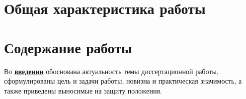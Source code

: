 \section*{Общая характеристика работы}

\newcommand{\actuality}{\pdfbookmark[1]{Актуальность}{actuality}\underline{\textbf{\actualityTXT}}}
\newcommand{\progress}{\pdfbookmark[1]{Разработанность темы}{progress}\underline{\textbf{\progressTXT}}}
\newcommand{\aim}{\pdfbookmark[1]{Цели}{aim}\underline{{\textbf\aimTXT}}}
\newcommand{\tasks}{\pdfbookmark[1]{Задачи}{tasks}\underline{\textbf{\tasksTXT}}}
\newcommand{\aimtasks}{\pdfbookmark[1]{Цели и задачи}{aimtasks}\aimtasksTXT}
\newcommand{\novelty}{\pdfbookmark[1]{Научная новизна}{novelty}\underline{\textbf{\noveltyTXT}}}
\newcommand{\influence}{\pdfbookmark[1]{Практическая значимость}{influence}\underline{\textbf{\influenceTXT}}}
\newcommand{\methods}{\pdfbookmark[1]{Методология и методы исследования}{methods}\underline{\textbf{\methodsTXT}}}
\newcommand{\defpositions}{\pdfbookmark[1]{Положения, выносимые на защиту}{defpositions}\underline{\textbf{\defpositionsTXT}}}
\newcommand{\reliability}{\pdfbookmark[1]{Достоверность}{reliability}\underline{\textbf{\reliabilityTXT}}}
\newcommand{\probation}{\pdfbookmark[1]{Апробация}{probation}\underline{\textbf{\probationTXT}}}
\newcommand{\contribution}{\pdfbookmark[1]{Личный вклад}{contribution}\underline{\textbf{\contributionTXT}}}
\newcommand{\publications}{\pdfbookmark[1]{Публикации}{publications}\underline{\textbf{\publicationsTXT}}}




\section*{Содержание работы}
Во \underline{\textbf{введении}} обоснована актуальность темы диссертационной работы, сформулированы цель и задачи работы, новизна и практическая значимость, а также приведены выносимые на защиту положения. 


